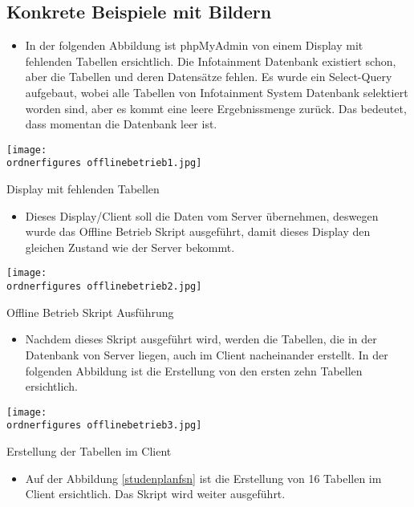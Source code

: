 \subsection{Konkrete Beispiele mit Bildern}
\begin{itemize}
	\item In der folgenden Abbildung ist phpMyAdmin von einem Display mit fehlenden Tabellen ersichtlich. Die Infotainment Datenbank existiert schon, aber die Tabellen und deren Datens\"atze fehlen. Es wurde ein Select-Query aufgebaut, wobei alle Tabellen von Infotainment System Datenbank selektiert worden sind, aber es kommt eine leere Ergebnissmenge zur\"uck. Das bedeutet, dass momentan die Datenbank leer ist.
\end{itemize}
\begin{center}
	\captionsetup{type=figure}
	\texttt{[image: \\ordnerfigures offlinebetrieb1.jpg]}
	\caption{Display mit fehlenden Tabellen}
	\label{dsp} 
\end{center}
\begin{itemize}
	\item Dieses Display/Client soll die Daten vom Server \"ubernehmen, deswegen wurde das Offline Betrieb Skript ausgef\"uhrt, damit dieses Display den gleichen Zustand wie der Server bekommt.
\end{itemize}
\begin{center}
	\captionsetup{type=figure}
	\texttt{[image: \\ordnerfigures offlinebetrieb2.jpg]}
	\caption{Offline Betrieb Skript Ausf\"uhrung}
	\label{Ofl} 
\end{center}
\begin{itemize}
	\item Nachdem dieses Skript ausgef\"uhrt wird, werden die Tabellen, die in der Datenbank von Server liegen, auch im Client nacheinander erstellt. In der folgenden Abbildung ist die Erstellung von den ersten zehn Tabellen ersichtlich.  
\end{itemize}
\begin{center}
	\captionsetup{type=figure}
	\texttt{[image: \\ordnerfigures offlinebetrieb3.jpg]}
	\caption{Erstellung der Tabellen im Client}
	\label{stundenplanfsn} 
\end{center}
\begin{itemize}
	\item Auf der Abbildung \ref{studenplanfsn} ist die Erstellung von 16 Tabellen im Client ersichtlich. Das Skript wird weiter ausgef\"uhrt. 
\end{itemize}
